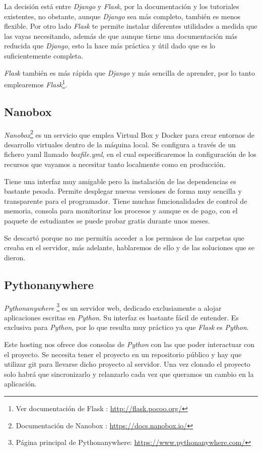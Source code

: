La decisión está entre\textit{ Django} y \textit{Flask}, por la documentación y los tutoriales existentes, no obstante, aunque \textit{Django} sea más completo, también es menos flexible. Por otro lado \textit{Flask} te permite instalar diferentes utilidades a medida que las vayas necesitando, además de que aunque tiene una documentación más reducida que \textit{Django}, esto la hace más práctica y útil dado que es lo suficientemente completa.

 \textit{Flask} también es más rápida que \textit{Django} y más sencilla de aprender, por lo tanto emplearemos \textit{Flask}\footnote{Ver documentación de Flask : \url{http://flask.pocoo.org/}}.



\subsection{Nanobox}
\textit{Nanobox}\footnote{Documentación de Nanobox : \url{https://docs.nanobox.io/}} es un servicio que emplea Virtual Box y Docker para crear entornos de desarrollo virtuales dentro de la máquina local. Se configura a través de un fichero yaml llamado \textit{boxfile.yml}, en el cual especificaremos la configuración de los recursos que vayamos a necesitar tanto localmente como en producción. 

Tiene una interfaz muy amigable pero la instalación de las dependencias es bastante pesada. Permite desplegar nuevas versiones de forma muy sencilla y transparente para el programador. Tiene muchas funcionalidades de control de memoria, consola para monitorizar los procesos y aunque es de pago, con el paquete de estudiantes se puede probar gratis durante unos meses.

Se descartó porque no me permitía acceder a los permisos de las carpetas que creaba en el servidor, más adelante, hablaremos de ello y de las soluciones que se dieron.

\subsection{Pythonanywhere}
\textit{Pythonanywhere} \footnote{Página principal de Pythonanywhere: \url{https://www.pythonanywhere.com/}} es un servidor web, dedicado exclusiamente a alojar aplicaciones escritas en \textit{Python}. Su interfaz es bastante fácil de entender. Es exclusiva para \textit{Python}, por lo que resulta muy práctico ya que \textit{Flask} es \textit{Python}.

Este hosting nos ofrece dos consolas de \textit{Python} con las que poder interactuar con el proyecto. Se necesita tener el proyecto en un repositorio público y hay que utilizar git para llevarse dicho proyecto al servidor. Una vez clonado el proyecto solo habrá que sincronizarlo y relanzarlo cada vez que queramos un cambio en la aplicación.

